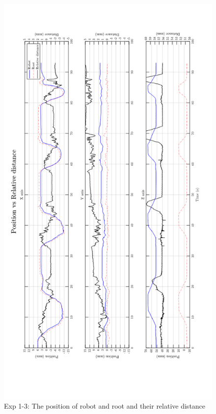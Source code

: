 \begin{figure}[htbp]
\begin{center}
\includegraphics[width=1\linewidth]{Images/exp/exp1_3_1.png}
\caption{Exp 1-3: The position of robot and root and their relative distance}
\label{fig: exp1_3_1}
\end{center}
\end{figure}	
